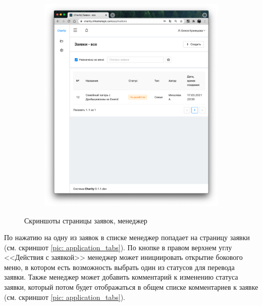 \documentclass[a4paper,12pt,reqno]{article}
\begin{document}
\begin{figure}[H]
\begin{subfigure}[b]{0.475\linewidth}
			\includegraphics[width=\linewidth]{img/ro/applications_m_filter.png}
		\end{subfigure}
		\caption{Скриншоты страницы заявок, менеджер}
		\label{pic: applications_m}
	\end{figure}
	
	По нажатию на одну из заявок в списке менеджер попадает на страницу заявки (см. скриншот \ref{pic: application_tabs}). По кнопке в правом верхнем углу <<Действия с заявкой>> менеджер может инициировать открытие бокового меню, в котором есть возможность выбрать один из статусов для перевода заявки. Также менеджер может добавить комментарий к изменению статуса заявки, который потом будет отображаться в общем списке комментариев к заявке (см. скриншот \ref{pic: application_tabs}).
	
\end{document}
